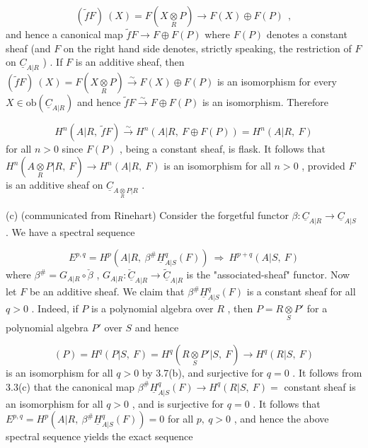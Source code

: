 \begin{equation*}
(\widetilde{f}F)\ (X) = F(X\underset{R}{\otimes}P) \to F(X)\oplus F(P)\ \ ,
\end{equation*}
and hence a canonical map  $\widetilde{f}F \to F\oplus F(P)$  where  $F(P)$  denotes a constant sheaf (and  $F$  on the right hand side denotes, strictly speaking, the restriction of  $F$ on  $\underline{C}_{A|R}$ ) . If  $F$  is an additive sheaf, then  $(\widetilde{f}F)\ (X) = F(X\underset{R}{\otimes}P) \overset{\sim}{\to} F(X)\oplus F(P)$ is an isomorphism for every  $X \in \mathrm{ob}(\underline{C}_{A|R})$  and hence  $\widetilde{f}F \overset{\sim}{\to} F\oplus F(P)$  is an isomorphism. Therefore 



\begin{equation*}
 H^{n}(A|R,\ \widetilde{f}F) \overset{\sim}{\to} H^{n}(A|R,\ F\oplus F(P)) = H^{n}(A|R,\ F)
\end{equation*}
for all  $n > 0$  since  $F(P)$ , being a constant sheaf, is flask. It follows that $H^{n}(A\underset{R}{\otimes}P|R,\ F) \to H^{n}(A|R,\ F)$  is an isomorphism for all  $n > 0$ , provided  $F$  is an additive sheaf on  $\underline{C}_{A\underset{R}{\otimes}P|R}$ .

(c)  (communicated from Rinehart) Consider the forgetful functor $\beta : \underline{C}_{A|R} \to \underline{C}_{A|S}$ . We have a spectral sequence

\begin{equation*}
E^{p,q} = H^{p}(A|R,\ \beta^{\#}\underline{H}^{q}_{A|S}(F))\ \Longrightarrow\ H^{p+q}(A|S,\ F)
\end{equation*}
where  $\beta^{\#} = G_{A|R}\circ\check{\beta}$ ,  $G_{A|R} : \underline{\check{C}}_{A|R} \to \underline{\widetilde{C}}_{A|R}$  is the "associated-sheaf"  functor. Now let  $F$  be an additive sheaf. We claim that  $\beta^{\#}\underline{H}^{q}_{A|S}(F)$  is a constant sheaf for all  $q > 0$ . Indeed, if  $P$  is a polynomial algebra over  $R$ , then  $P = R\underset{S}{\otimes}P'$ for a polynomial algebra  $P'$  over  $S$  and hence

\begin{equation*}
[\beta^{\#}\underline{H}^{q}_{A|S}(F)](P) = H^{q}(P|S,\ F) = H^{q}(R\underset{S}{\otimes}P'|S,\ F) \to H^{q}(R|S,\ F)
\end{equation*}
is an isomorphism for all  $q > 0$  by 3.7(b), and surjective for  $q = 0$ . It follows from 3.3(c) that the canonical map  $\beta^{\#}\underline{H}^{q}_{A|S}(F) \to H^{q}(R|S,\ F) =$ constant sheaf is an isomorphism for all  $q > 0$ , and is surjective for  $q = 0$ . It follows that $E^{p,q} = H^{p}(A|R,\ \beta^{\#}\underline{H}^{q}_{A|S}(F)) = 0$  for all  $p,\ q > 0$ , and hence the above spectral sequence yields the exact sequence


